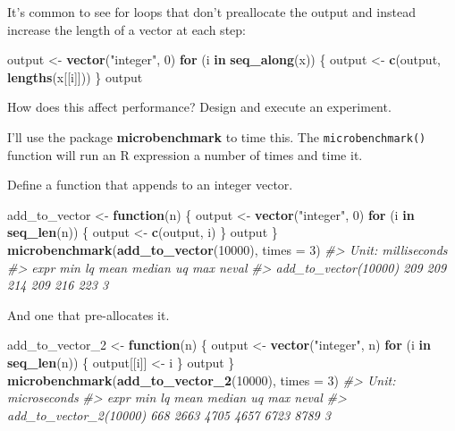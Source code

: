 \documentclass[]{book}
\newenvironment{Shaded}{\begin{snugshade}}{\end{snugshade}}
\newcommand{\CommentTok}[1]{\textcolor[rgb]{0.56,0.35,0.01}{\textit{#1}}}
\newcommand{\ControlFlowTok}[1]{\textcolor[rgb]{0.13,0.29,0.53}{\textbf{#1}}}
\newcommand{\DataTypeTok}[1]{\textcolor[rgb]{0.13,0.29,0.53}{#1}}
\newcommand{\DecValTok}[1]{\textcolor[rgb]{0.00,0.00,0.81}{#1}}
\newcommand{\KeywordTok}[1]{\textcolor[rgb]{0.13,0.29,0.53}{\textbf{#1}}}
\newcommand{\NormalTok}[1]{#1}
\newcommand{\StringTok}[1]{\textcolor[rgb]{0.31,0.60,0.02}{#1}}
\theoremstyle{plain}
\theoremstyle{remark}
\begin{document}
It's common to see for loops that don't preallocate the output and
instead increase the length of a vector at each step:

\begin{Shaded}
\begin{Highlighting}[]
\NormalTok{output <-}\StringTok{ }\KeywordTok{vector}\NormalTok{(}\StringTok{"integer"}\NormalTok{, }\DecValTok{0}\NormalTok{)}
\ControlFlowTok{for}\NormalTok{ (i }\ControlFlowTok{in} \KeywordTok{seq_along}\NormalTok{(x)) \{}
\NormalTok{  output <-}\StringTok{ }\KeywordTok{c}\NormalTok{(output, }\KeywordTok{lengths}\NormalTok{(x[[i]]))}
\NormalTok{\}}
\NormalTok{output}
\end{Highlighting}
\end{Shaded}

How does this affect performance? Design and execute an experiment.

I'll use the package \textbf{microbenchmark} to time this. The
\texttt{microbenchmark()} function will run an R expression a number of
times and time it.

Define a function that appends to an integer vector.

\begin{Shaded}
\begin{Highlighting}[]
\NormalTok{add_to_vector <-}\StringTok{ }\ControlFlowTok{function}\NormalTok{(n) \{}
\NormalTok{  output <-}\StringTok{ }\KeywordTok{vector}\NormalTok{(}\StringTok{"integer"}\NormalTok{, }\DecValTok{0}\NormalTok{)}
  \ControlFlowTok{for}\NormalTok{ (i }\ControlFlowTok{in} \KeywordTok{seq_len}\NormalTok{(n)) \{}
\NormalTok{    output <-}\StringTok{ }\KeywordTok{c}\NormalTok{(output, i)}
\NormalTok{  \}}
\NormalTok{  output  }
\NormalTok{\}}
\KeywordTok{microbenchmark}\NormalTok{(}\KeywordTok{add_to_vector}\NormalTok{(}\DecValTok{10000}\NormalTok{), }\DataTypeTok{times =} \DecValTok{3}\NormalTok{)}
\CommentTok{#> Unit: milliseconds}
\CommentTok{#>                  expr min  lq mean median  uq max neval}
\CommentTok{#>  add_to_vector(10000) 209 209  214    209 216 223     3}
\end{Highlighting}
\end{Shaded}

And one that pre-allocates it.

\begin{Shaded}
\begin{Highlighting}[]
\NormalTok{add_to_vector_}\DecValTok{2}\NormalTok{ <-}\StringTok{ }\ControlFlowTok{function}\NormalTok{(n) \{}
\NormalTok{  output <-}\StringTok{ }\KeywordTok{vector}\NormalTok{(}\StringTok{"integer"}\NormalTok{, n)}
  \ControlFlowTok{for}\NormalTok{ (i }\ControlFlowTok{in} \KeywordTok{seq_len}\NormalTok{(n)) \{}
\NormalTok{    output[[i]] <-}\StringTok{ }\NormalTok{i}
\NormalTok{  \}}
\NormalTok{  output}
\NormalTok{\}}
\KeywordTok{microbenchmark}\NormalTok{(}\KeywordTok{add_to_vector_2}\NormalTok{(}\DecValTok{10000}\NormalTok{), }\DataTypeTok{times =} \DecValTok{3}\NormalTok{)}
\CommentTok{#> Unit: microseconds}
\CommentTok{#>                    expr min   lq mean median   uq  max neval}
\CommentTok{#>  add_to_vector_2(10000) 668 2663 4705   4657 6723 8789     3}
\end{Highlighting}
\end{Shaded}
\end{document}
